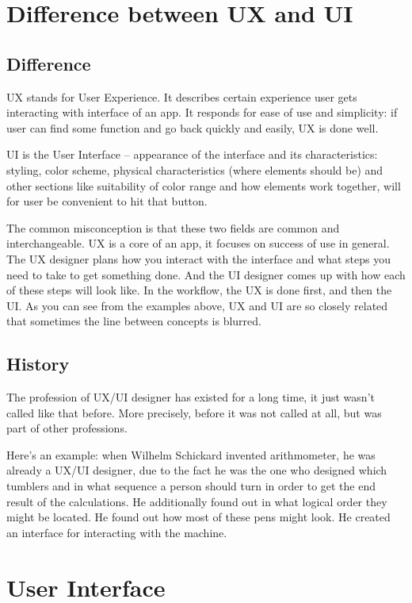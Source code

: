 \documentclass[10pt,twoside,english,a4paper]{article}
\begin{document}
\section{Difference between UX and UI} \label{UX/UI}
\subsection{Difference}

UX stands for User Experience. It describes certain experience user gets interacting with interface of an app. It responds for ease of use and simplicity: if user can find some function and go back quickly and easily, UX is done well.

UI is the User Interface – appearance of the interface and its characteristics: styling, color scheme, physical characteristics (where elements should be) and other sections like suitability of color range and how elements work together, will for user be convenient to hit that button. 

The common misconception is that these two fields are common and interchangeable. UX is a core of an app, it focuses on success of use in general. The UX designer plans how you interact with the interface and what steps you need to take to get something done. And the UI designer comes up with how each of these steps will look like. In the workflow, the UX is done first, and then the UI. As you can see from the examples above, UX and UI are so closely related that sometimes the line between concepts is blurred.

\subsection{History}
The profession of UX/UI designer has existed for a long time, it just wasn't called like that before. More precisely, before it was not called at all, but was part of other professions.

Here’s an example: when Wilhelm Schickard invented arithmometer, he was already a UX/UI designer, due to the fact he was the one who designed which tumblers and in what sequence a person should turn in order to get the end result of the calculations. He additionally found out in what logical order they might be located. He found out how most of these pens might look. He created an interface for interacting with the machine.



\section{User Interface} \label{UI}
\end{document}
